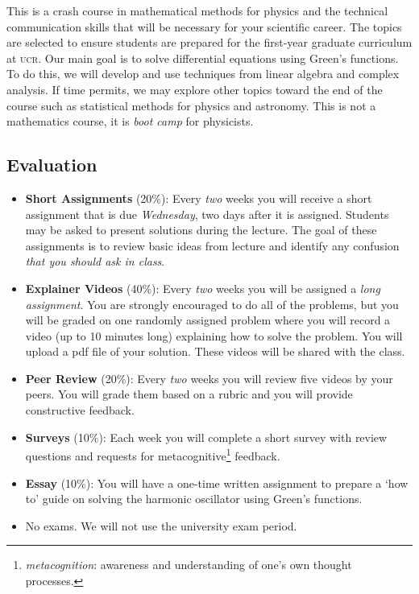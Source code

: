 \documentclass[12pt]{article}
\numberwithin{equation}{section}    %
\begin{document}
This is a crash course in mathematical methods for physics and the technical communication skills that will be necessary for your scientific career. The topics are selected to ensure students are prepared for the first-year graduate curriculum at \textsc{ucr}. Our main goal is to solve differential equations using Green's functions. To do this, we will develop and use techniques from linear algebra and complex analysis. If time permits, we may explore other topics toward the end of the course such as statistical methods for physics and astronomy.
%
This is not a mathematics course, it is \emph{boot camp} for physicists. 

\subsection*{Evaluation}

\begin{itemize}
\item \textbf{Short Assignments} (20\%): Every \emph{two} weeks you will receive a short assignment that is due \emph{Wednesday}, two days after it is assigned. Students may be asked to present solutions during the lecture. The goal of these assignments is to review basic ideas from lecture and identify any confusion \emph{that you should ask in class}. 

\item \textbf{Explainer Videos} (40\%): Every \emph{two} weeks you will be assigned a \emph{long assignment}. You are strongly encouraged to do all of the problems, but you will be graded on one randomly assigned problem where you will record a video (up to 10 minutes long) explaining how to solve the problem. You will upload a pdf file of your solution. These videos will be shared with the class. 

\item \textbf{Peer Review} (20\%): Every \emph{two} weeks you will review five videos by your peers. You will grade them based on a rubric and you will provide constructive feedback. 

\item \textbf{Surveys} (10\%): Each week you will complete a short survey with review questions and requests for metacognitive\footnote{\emph{metacognition}: awareness and understanding of one's own thought processes.} feedback.

\item \textbf{Essay} (10\%): You will have a one-time written assignment to prepare a `how to' guide on solving the harmonic oscillator using Green's functions. 

\item No exams. We will not use the university exam period.
\end{itemize}
\end{document}

